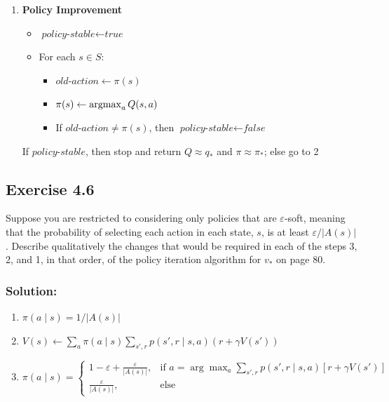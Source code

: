 {\begin{minipage}{0.95\textwidth}
\begin{enumerate}
    \item \textbf{Policy Improvement}
    \begin{itemize}
        \item[] $\textit{policy-stable} \leftarrow \textit{true}$
        \item[] For each $s \in S$:
        \begin{itemize}
            \item[] $\textit{old-action} \leftarrow \pi(s)$
            \item[] $\pi(s) \leftarrow \operatorname*{argmax}_a Q(s,a) $
            \item[] If $\textit{old-action} \neq \pi(s)$, then $\textit{policy-stable} \leftarrow \textit{false}$
        \end{itemize}
    \end{itemize}
    If $\textit{policy-stable}$, then stop and return $Q \approx q_*$ and $\pi \approx \pi_*$; else go to 2
\end{enumerate}
\end{minipage}
}

\subsection*{Exercise 4.6}
Suppose you are restricted to considering only policies that are $\varepsilon$-soft,
meaning that the probability of selecting each action in each state, $s$, is at least $\varepsilon/|A(s)|$.
Describe qualitatively the changes that would be required in each of the steps 3, 2, and 1,
in that order, of the policy iteration algorithm for $v_*$ on page 80.

\subsubsection*{Solution:}

\begin{enumerate}
    \item $\pi(a \mid s) = 1/|A(s)|$
    \item $V(s) \leftarrow \sum_a \pi(a \mid s) \sum_{s',r} p(s',r \mid s, a) (r + \gamma V(s'))$
    \item \footnotesize $
    \pi(a \mid s) =
        \begin{cases}
            1-\varepsilon + \frac{\varepsilon}{|A(s)|},  & \text{if } a = \arg \max_a \sum_{s',r} p(s', r \mid s, a) [r + \gamma V(s')]\\
            \frac{\varepsilon}{|A(s)|},  & \text{else}
        \end{cases}
    $
\end{enumerate}

